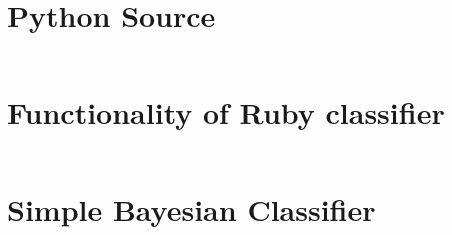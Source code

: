 \documentclass[a4paper,oneside]{article}
\begin{document}
\begin{appendices}
  \section{Python Source}
  \inputminted[linenos,numbersep=5pt,gobble=0,frame=lines,framesep=2mm,
    fontsize=\footnotesize]{python}{../classifier.py}

  \section{Functionality of Ruby classifier}
  \inputminted[linenos,numbersep=5pt,gobble=0,frame=lines,framesep=2mm,
    fontsize=\footnotesize]{console}{../rspec_output.txt}

  \section{Simple Bayesian Classifier}
  \inputminted[linenos,numbersep=5pt,gobble=0,frame=lines,framesep=2mm,
    fontsize=\footnotesize]{ruby}{../bayesian_classifier.rb}
\end{appendices}
\end{document}
